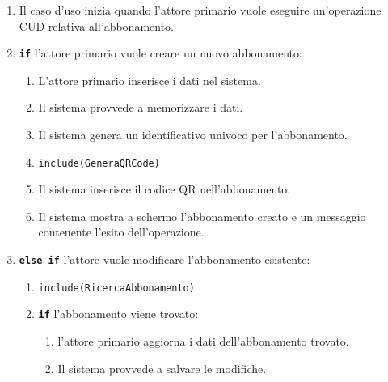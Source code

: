 \documentclass{article}
\begin{document}
	\begin{enumerate}[itemsep=8pt,parsep=0pt]

		\item Il caso d'uso inizia quando l'attore primario vuole eseguire un'operazione CUD relativa all'abbonamento.

		\item \texttt{\textbf{if}} l'attore primario vuole creare un nuovo abbonamento:
			\begin{enumerate}	[leftmargin=28pt]
			    \item L'attore primario inserisce i dati nel sistema.
				    \item  Il sistema provvede a memorizzare i dati.
					\item Il sistema genera un identificativo univoco per l'abbonamento.
				    \item \texttt{include(GeneraQRCode)}
                    	    \item Il sistema inserisce il codice QR nell'abbonamento.
				    \item Il sistema mostra a schermo l'abbonamento creato e un messaggio contenente l'esito dell'operazione.
  			\end{enumerate}	

		\item \texttt{\textbf{else if}}  l’attore vuole modificare l'abbonamento esistente:
			\begin{enumerate}[leftmargin=28pt]
			   \item  \texttt{{include(RicercaAbbonamento)}}
			   \item \texttt{\textbf{if}} l'abbonamento viene trovato:
			    \begin{enumerate}	[leftmargin=28pt]
			        \item l'attore primario aggiorna i dati dell'abbonamento trovato.
			        \item  Il sistema provvede a salvare le modifiche.
                \end{enumerate}
  			\end{enumerate}	
  			

\end{enumerate}
\end{document}
